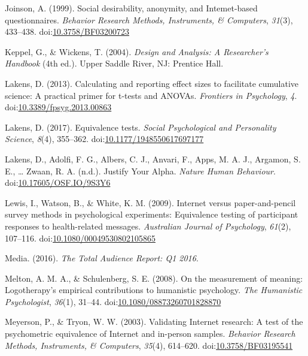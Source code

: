 \documentclass[english,man, mask]{apa6}
\theoremstyle{definition}
\theoremstyle{definition}
\theoremstyle{definition}
\theoremstyle{remark}
\begin{document}
\hypertarget{ref-Joinson1999}{}
Joinson, A. (1999). Social desirability, anonymity, and Intemet-based
questionnaires. \emph{Behavior Research Methods, Instruments, \&
Computers}, \emph{31}(3), 433--438.
doi:\href{https://doi.org/10.3758/BF03200723}{10.3758/BF03200723}

\hypertarget{ref-Keppel2004}{}
Keppel, G., \& Wickens, T. (2004). \emph{Design and Analysis: A
Researcher's Handbook} (4th ed.). Upper Saddle River, NJ: Prentice Hall.

\hypertarget{ref-Lakens2013}{}
Lakens, D. (2013). Calculating and reporting effect sizes to facilitate
cumulative science: A practical primer for t-tests and ANOVAs.
\emph{Frontiers in Psychology}, \emph{4}.
doi:\href{https://doi.org/10.3389/fpsyg.2013.00863}{10.3389/fpsyg.2013.00863}

\hypertarget{ref-Lakens2017a}{}
Lakens, D. (2017). Equivalence tests. \emph{Social Psychological and
Personality Science}, \emph{8}(4), 355--362.
doi:\href{https://doi.org/10.1177/1948550617697177}{10.1177/1948550617697177}

\hypertarget{ref-Lakens2017}{}
Lakens, D., Adolfi, F. G., Albers, C. J., Anvari, F., Apps, M. A. J.,
Argamon, S. E., \ldots{} Zwaan, R. A. (n.d.). Justify Your Alpha.
\emph{Nature Human Behaviour}.
doi:\href{https://doi.org/10.17605/OSF.IO/9S3Y6}{10.17605/OSF.IO/9S3Y6}

\hypertarget{ref-Lewis2009}{}
Lewis, I., Watson, B., \& White, K. M. (2009). Internet versus
paper-and-pencil survey methods in psychological experiments:
Equivalence testing of participant responses to health-related messages.
\emph{Australian Journal of Psychology}, \emph{61}(2), 107--116.
doi:\href{https://doi.org/10.1080/00049530802105865}{10.1080/00049530802105865}

\hypertarget{ref-Media2016}{}
Media. (2016). \emph{The Total Audience Report: Q1 2016}.

\hypertarget{ref-Melton2008}{}
Melton, A. M. A., \& Schulenberg, S. E. (2008). On the measurement of
meaning: Logotherapy's empirical contributions to humanistic psychology.
\emph{The Humanistic Psychologist}, \emph{36}(1), 31--44.
doi:\href{https://doi.org/10.1080/08873260701828870}{10.1080/08873260701828870}

\hypertarget{ref-Meyerson2003}{}
Meyerson, P., \& Tryon, W. W. (2003). Validating Internet research: A
test of the psychometric equivalence of Internet and in-person samples.
\emph{Behavior Research Methods, Instruments, \& Computers},
\emph{35}(4), 614--620.
doi:\href{https://doi.org/10.3758/BF03195541}{10.3758/BF03195541}
\end{document}
